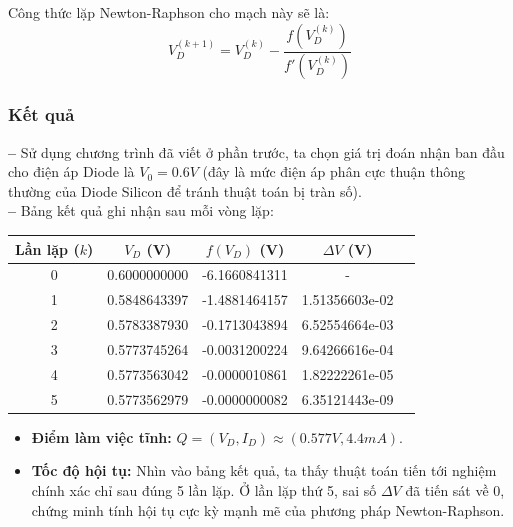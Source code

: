 Công thức lặp Newton-Raphson cho mạch này sẽ là:
\begin{equation}
V_D^{(k+1)} = V_D^{(k)} - \frac{f(V_D^{(k)})}{f'(V_D^{(k)})}
\end{equation}

\subsubsection*{Kết quả}
\noindent \textbf{--} Sử dụng chương trình đã viết ở phần trước, ta chọn giá trị đoán nhận ban đầu cho điện áp Diode là $V_0 = 0.6V$ (đây là mức điện áp phân cực thuận thông thường của Diode Silicon để tránh thuật toán bị tràn số).\\ \noindent \textbf{--} Bảng kết quả ghi nhận sau mỗi vòng lặp:

\begin{table}[h]
\centering
\begin{tabular}{|c|c|c|c|c|}
    \renewcommand{\arraystretch}{1.2} %
        Lần lặp ($k$) & $V_D$ (V) & $f(V_D)$ (V) &$\Delta V$ (V) \\
        \hline
        0 & 0.6000000000 & -6.1660841311 & - \\
        \hline
        1 & 0.5848643397 & -1.4881464157  & 1.51356603e-02 \\
        \hline
        2 & 0.5783387930 & -0.1713043894  & 6.52554664e-03 \\
        \hline
        3 & 0.5773745264 & -0.0031200224  & 9.64266616e-04 \\
        \hline
        4 & 0.5773563042 & -0.0000010861  & 1.82222261e-05 \\
        \hline
        5 & 0.5773562979 & -0.0000000082  & 6.35121443e-09 \\
        \hline
\end{tabular}
\end{table}


\begin{itemize}[label=\textbf{+}]
    \item \textbf{Điểm làm việc tĩnh:} $Q=(V_D,I_D) \approx (0.577V,4.4mA)$.
    \item \textbf{Tốc độ hội tụ:} Nhìn vào bảng kết quả, ta thấy thuật toán tiến tới nghiệm chính xác chỉ sau đúng 5 lần lặp. Ở lần lặp thứ 5, sai số $\Delta V$ đã tiến sát về 0, chứng minh tính hội tụ cực kỳ mạnh mẽ của phương pháp Newton-Raphson. 
\end{itemize}
